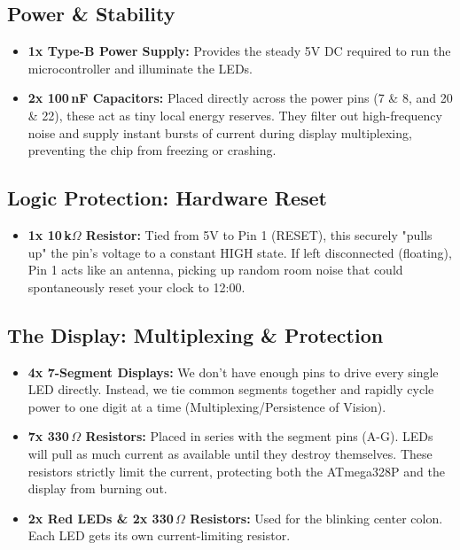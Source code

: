 \documentclass[11pt,a4paper]{article}
\begin{document}
\subsection*{Power \& Stability}
\begin{itemize}
    \item \textbf{1x Type-B Power Supply:} Provides the steady 5V DC required to run the microcontroller and illuminate the LEDs.
    \item \textbf{2x 100\,nF Capacitors:} Placed directly across the power pins (7 \& 8, and 20 \& 22), these act as tiny local energy reserves. They filter out high-frequency noise and supply instant bursts of current during display multiplexing, preventing the chip from freezing or crashing.
\end{itemize}

\subsection*{Logic Protection: Hardware Reset}
\begin{itemize}
    \item \textbf{1x 10\,k$\Omega$ Resistor:} Tied from 5V to Pin 1 (RESET), this securely "pulls up" the pin's voltage to a constant HIGH state. If left disconnected (floating), Pin 1 acts like an antenna, picking up random room noise that could spontaneously reset your clock to 12:00.
\end{itemize}

\subsection*{The Display: Multiplexing \& Protection}
\begin{itemize}
    \item \textbf{4x 7-Segment Displays:} We don't have enough pins to drive every single LED directly. Instead, we tie common segments together and rapidly cycle power to one digit at a time (Multiplexing/Persistence of Vision).
    \item \textbf{7x 330\,$\Omega$ Resistors:} Placed in series with the segment pins (A-G). LEDs will pull as much current as available until they destroy themselves. These resistors strictly limit the current, protecting both the ATmega328P and the display from burning out.
    \item \textbf{2x Red LEDs \& 2x 330\,$\Omega$ Resistors:} Used for the blinking center colon. Each LED gets its own current-limiting resistor.
\end{itemize}
\end{document}
